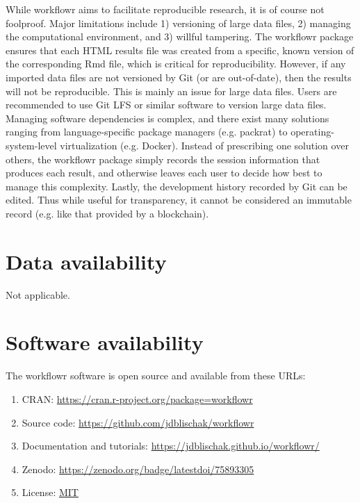 \documentclass[9pt,a4paper]{extarticle}
\begin{document}
While workflowr aims to facilitate reproducible research, it is of
course not foolproof. Major limitations include 1) versioning of large
data files, 2) managing the computational environment, and 3) willful
tampering. The workflowr package ensures that each HTML results file was
created from a specific, known version of the corresponding Rmd file,
which is critical for reproducibility. However, if any imported data
files are not versioned by Git (or are out-of-date), then the results
will not be reproducible. This is mainly an issue for large data files.
Users are recommended to use Git LFS or similar software to version
large data files. Managing software dependencies is complex, and there
exist many solutions ranging from language-specific package managers
(e.g. packrat) to operating-system-level virtualization (e.g. Docker).
Instead of prescribing one solution over others, the workflowr package
simply records the session information that produces each result, and
otherwise leaves each user to decide how best to manage this complexity.
Lastly, the development history recorded by Git can be edited. Thus
while useful for transparency, it cannot be considered an immutable
record (e.g. like that provided by a blockchain).


\section*{Data availability}

Not applicable.


\section*{Software availability}

The workflowr software is open source and available from these URLs:

\begin{enumerate}

\item CRAN: \url{https://cran.r-project.org/package=workflowr}

\item Source code: \url{https://github.com/jdblischak/workflowr}

\item Documentation and tutorials:
\url{https://jdblischak.github.io/workflowr/}

\item Zenodo: \url{https://zenodo.org/badge/latestdoi/75893305}

\item License: \href{https://choosealicense.com/licenses/mit}{MIT}

\end{enumerate}
\end{document}
